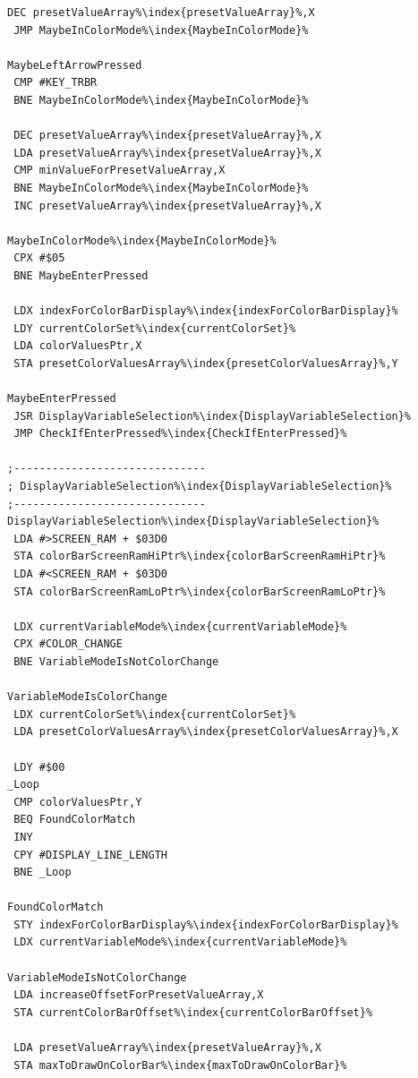 \begin{minipage}[b]{0.33\linewidth}
\begin{lrbox}{\mybox}%
\begin{lstlisting}[basicstyle=\ttfamily\tiny,escapechar=\%]
 DEC presetValueArray%\index{presetValueArray}%,X
 JMP MaybeInColorMode%\index{MaybeInColorMode}%

MaybeLeftArrowPressed
 CMP #KEY_TRBR
 BNE MaybeInColorMode%\index{MaybeInColorMode}%

 DEC presetValueArray%\index{presetValueArray}%,X
 LDA presetValueArray%\index{presetValueArray}%,X
 CMP minValueForPresetValueArray,X
 BNE MaybeInColorMode%\index{MaybeInColorMode}%
 INC presetValueArray%\index{presetValueArray}%,X

MaybeInColorMode%\index{MaybeInColorMode}%
 CPX #$05
 BNE MaybeEnterPressed

 LDX indexForColorBarDisplay%\index{indexForColorBarDisplay}%
 LDY currentColorSet%\index{currentColorSet}%
 LDA colorValuesPtr,X
 STA presetColorValuesArray%\index{presetColorValuesArray}%,Y

MaybeEnterPressed
 JSR DisplayVariableSelection%\index{DisplayVariableSelection}%
 JMP CheckIfEnterPressed%\index{CheckIfEnterPressed}%

;------------------------------
; DisplayVariableSelection%\index{DisplayVariableSelection}%
;------------------------------
DisplayVariableSelection%\index{DisplayVariableSelection}%
 LDA #>SCREEN_RAM + $03D0
 STA colorBarScreenRamHiPtr%\index{colorBarScreenRamHiPtr}%
 LDA #<SCREEN_RAM + $03D0
 STA colorBarScreenRamLoPtr%\index{colorBarScreenRamLoPtr}%

 LDX currentVariableMode%\index{currentVariableMode}%
 CPX #COLOR_CHANGE
 BNE VariableModeIsNotColorChange

VariableModeIsColorChange
 LDX currentColorSet%\index{currentColorSet}%
 LDA presetColorValuesArray%\index{presetColorValuesArray}%,X

 LDY #$00
_Loop   
 CMP colorValuesPtr,Y
 BEQ FoundColorMatch
 INY
 CPY #DISPLAY_LINE_LENGTH
 BNE _Loop

FoundColorMatch
 STY indexForColorBarDisplay%\index{indexForColorBarDisplay}%
 LDX currentVariableMode%\index{currentVariableMode}%

VariableModeIsNotColorChange
 LDA increaseOffsetForPresetValueArray,X
 STA currentColorBarOffset%\index{currentColorBarOffset}%

 LDA presetValueArray%\index{presetValueArray}%,X
 STA maxToDrawOnColorBar%\index{maxToDrawOnColorBar}%


\end{lstlisting}
\end{lrbox}
\end{minipage}

